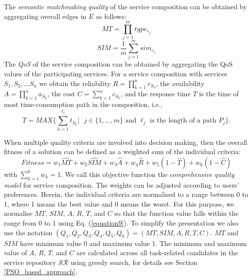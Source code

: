 \documentclass{llncs}
\begin{document}
The \emph{semantic matchmaking quality} of the service composition can be obtained by aggregating overall edges in $E$ as follows:
\vspace{-0.2cm}
\begin{equation}
\label{equation6}
MT {=} \prod_{j=1}^{m} type_ {e_{j}}
\end{equation}
\begin{equation}
\label{equation7}
SIM {=} \frac{1}{m}\sum_{j=1}^m sim_ {e_{j}}
\end{equation}
The \emph{QoS} of the service composition can be obtained by aggregating the QoS values of the participating services. For a service composition with services $ S_1, S_2, ... S_n$ we obtain the reliability $R=\prod\limits^n_{k=1}r_{S_k}$, the availability $A=\prod\limits^n_{k=1}a_{S_k}$, the cost $C=\sum\limits^n_{k=1}c_{S_k}$, and the response time $T$ is the time of most time-consumption path in the composition, i.e., $$T = MAX \{\sum\limits^{\ell_j}_{k=1}t_{S_k} | \text{ $j\in\{1,\ldots,m\}$ and $\ell_j$ is the length of a path $P_j$}\}.$$

\vspace{-0.1cm}
\noindent When multiple quality criteria are involved into decision making, then the overall fitness of a solution can be defined as a weighted sum of the individual criteria: 
\vspace{-0.2cm}
\begin{equation}
\label{equation8}
Fitness = w_1 \hat{MT} + w_2 \hat{SIM} + w_3 \hat{A} + w_4 \hat{R} + w_5(1 - \hat{T}) + w_6(1 - \hat{C})
\end{equation}
\noindent with $\sum_{k=1}^{6} w_k= 1$. We call this objective function the \emph{comprehensive quality model} for service composition.
The weights can be adjusted according to users' preferences. Herein, the individual criteria are normalised to a range between 0 to 1, where 1 means the best value and 0 means the worst. For this purpose, we normalise $MT$, $SIM$, $A$, $R$, $T$, and $C$ so that the function value falls within the range from 0 to 1 using Eq. (\ref{equation9}). To simplify the presentation we also use the notation $(Q_1,Q_2,Q_3,Q_4,Q_5,Q_6) = (MT,SIM,A,R,T,C)$. $MT$ and $SIM$ have minimum value 0 and maximum value 1. The minimum and maximum value of $A$, $R$, $T$, and $C$ are calculated across all task-related candidates in the service repository $\mathcal{SR}$ using greedy search, for details see Section \ref{PSO_based_approach}.
\end{document}
